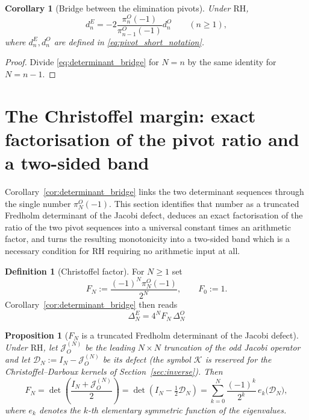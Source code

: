 \documentclass[11pt]{amsart}
\numberwithin{equation}{section}
\theoremstyle{plain}
\newtheorem{proposition}[theorem]{Proposition}
\newtheorem{corollary}[theorem]{Corollary}
\theoremstyle{definition}
\newtheorem{definition}[theorem]{Definition}
\theoremstyle{remark}
\newcommand{\RH}{\mathrm{RH}}
\begin{document}
\begin{corollary}[Bridge between the elimination pivots]
\label{cor:pivot_bridge}
Under $\RH$,
\begin{equation}
d_n^E
=-2\frac{\pi_n^O(-1)}{\pi_{n-1}^O(-1)}d_n^O
\qquad(n\ge1),
\label{eq:pivot_bridge}
\end{equation}
where $d_n^E,d_n^O$ are defined in \eqref{eq:pivot_short_notation}.
\end{corollary}

\begin{proof}
Divide \eqref{eq:determinant_bridge} for $N=n$ by the same identity for $N=n-1$.
\end{proof}


\section{The Christoffel margin: exact factorisation of the pivot ratio and a two-sided band}
\label{sec:christoffel_bridge}

Corollary~\ref{cor:determinant_bridge} links the two determinant sequences through the
single number $\pi_N^O(-1)$.  This section identifies that number as a truncated Fredholm
determinant of the Jacobi defect, deduces an exact factorisation of the ratio of the two
pivot sequences into a universal constant times an arithmetic factor, and turns the
resulting monotonicity into a two-sided band which is a necessary condition for $\RH$
requiring no arithmetic input at all.

\begin{definition}[Christoffel factor]
\label{def:christoffel_factor}
For $N\ge1$ set
\begin{equation}
 F_N:=\frac{(-1)^N\pi_N^O(-1)}{2^N},
 \qquad F_0:=1 .
 \label{eq:FN_definition}
\end{equation}
Corollary~\ref{cor:determinant_bridge} then reads
\begin{equation}
 \boxed{\;\Delta_N^E=4^N F_N\,\Delta_N^O\;}
 \label{eq:determinant_bridge_normalized}
\end{equation}
\end{definition}

\begin{proposition}[$F_N$ is a truncated Fredholm determinant of the Jacobi defect]
\label{prop:FN_spectral}
Under $\RH$, let $\mathcal J_O^{(N)}$ be the leading $N\times N$ truncation of the odd Jacobi
operator and let $\mathcal D_N:=I_N-\mathcal J_O^{(N)}$ be its defect (the symbol $\mathcal K$ is reserved for the Christoffel--Darboux kernels of Section~\ref{sec:inverse}).  Then
\begin{equation}
 \boxed{\;
 F_N=\det\!\left(\frac{I_N+\mathcal J_O^{(N)}}{2}\right)
 =\det\!\left(I_N-\tfrac12\mathcal D_N\right)
 =\sum_{k=0}^{N}\frac{(-1)^k}{2^k}\,e_k\bigl(\mathcal D_N\bigr),\;}
 \label{eq:FN_spectral}
\end{equation}
where $e_k$ denotes the $k$-th elementary symmetric function of the eigenvalues.
\end{proposition}
\end{document}
